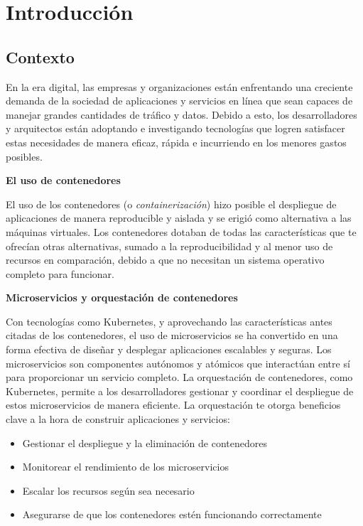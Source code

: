 \chapter{Introducción}
\label{ch:introduccion}

\section{Contexto}

En la era digital, las empresas y organizaciones están enfrentando una creciente demanda de la sociedad de aplicaciones y servicios en línea que sean capaces de manejar grandes cantidades de tráfico y datos. Debido a esto, los desarrolladores y arquitectos están adoptando e investigando tecnologías que logren satisfacer estas necesidades de manera eficaz, rápida e incurriendo en los menores gastos posibles.

\textbf{El uso de contenedores}

El uso de los contenedores (o \textit{containerización}) hizo posible el despliegue de aplicaciones de manera reproducible y aislada y se erigió como alternativa a las máquinas virtuales. Los contenedores dotaban de todas las características que te ofrecían otras alternativas, sumado a la reproducibilidad y al menor uso de recursos en comparación, debido a que no necesitan un sistema operativo completo para funcionar.

\textbf{Microservicios y orquestación de contenedores}

Con tecnologías como Kubernetes, y aprovechando las características antes citadas de los contenedores, el uso de microservicios se ha convertido en una forma efectiva de diseñar y desplegar aplicaciones escalables y seguras. Los microservicios son componentes autónomos y atómicos que interactúan entre sí para proporcionar un servicio completo. La orquestación de contenedores, como Kubernetes, permite a los desarrolladores gestionar y coordinar el despliegue de estos microservicios de manera eficiente. La orquestación te otorga beneficios clave a la hora de construir aplicaciones y servicios:

\begin{itemize}
    \item Gestionar el despliegue y la eliminación de contenedores
    \item Monitorear el rendimiento de los microservicios
    \item Escalar los recursos según sea necesario
    \item Asegurarse de que los contenedores estén funcionando correctamente
\end{itemize}

